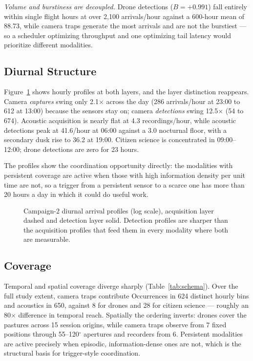 \documentclass[sigconf]{acmart}
\begin{document}
\emph{Volume and burstiness are decoupled.} Drone detections
($B{=}+0.991$) fall entirely within single flight hours at over
2{,}100 arrivals/hour against a 600-hour mean of 88.73, while camera
traps generate the most arrivals and are not the burstiest --- so a
scheduler optimizing throughput and one optimizing tail latency would
prioritize different modalities.

\subsection{Diurnal Structure}

Figure~\ref{fig:diurnal} shows hourly profiles at both layers, and the
layer distinction reappears. Camera \emph{captures} swing only
2.1$\times$ across the day (286 arrivals/hour at 23:00 to 612 at 13:00)
because the sensors stay on; camera \emph{detections} swing
12.5$\times$ (54 to 674). Acoustic acquisition is nearly flat at
4.3 recordings/hour, while acoustic detections peak at 41.6/hour at
06:00 against a 3.0 nocturnal floor, with a secondary dusk rise to 36.2
at 19:00. Citizen science is concentrated in 09:00--12:00; drone
detections are zero for 23 hours.

The profiles show the coordination opportunity directly: the modalities
with persistent coverage are active when those with high information
density per unit time are not, so a trigger from a
persistent sensor to a scarce one has more than 20 hours a day in which
it could do useful work.

\begin{figure}[t]
    \centering
    \caption{Campaign-2 diurnal arrival profiles (log scale),
    acquisition layer dashed and detection layer solid. Detection
    profiles are sharper than the acquisition profiles that feed them in
    every modality where both are measurable.}
    \label{fig:diurnal}
\end{figure}

\subsection{Coverage}

Temporal and spatial coverage diverge sharply (Table~\ref{tab:schema}).
Over the full study extent, camera traps contribute Occurrences in
624 distinct hourly bins and acoustics in 650, against 8 for drones and
28 for citizen science --- roughly an 80$\times$ difference in temporal reach.
Spatially the ordering inverts: drones cover the pastures across
15 session origins, while camera traps observe from 7 fixed positions
through 55--120$^\circ$ apertures and recorders from 6. Persistent
modalities are active precisely when episodic, information-dense ones
are not, which is the structural basis for trigger-style coordination.
\end{document}
